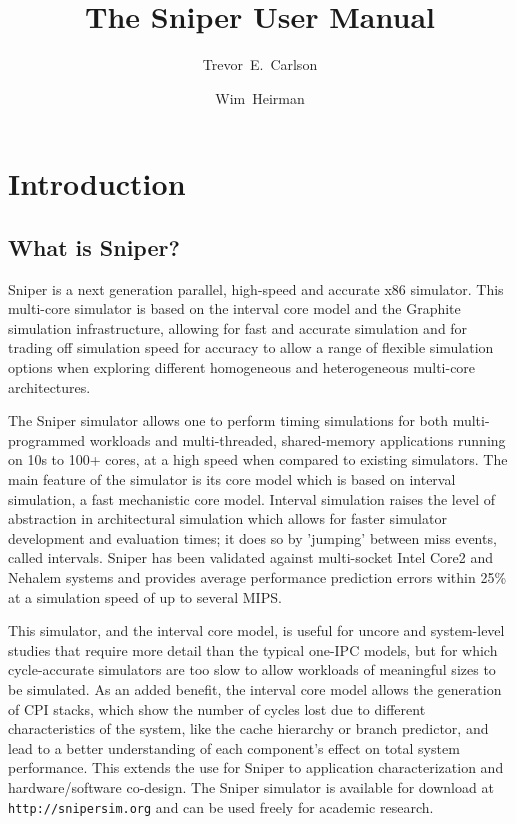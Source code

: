 \documentclass[a4paper,11pt,titlepage]{article}
\author{Trevor~E.~Carlson \and Wim~Heirman}
\title{The Sniper User Manual}
\begin{document}
\maketitle
\setcounter{tocdepth}{2}
\tableofcontents

\section{Introduction}

\subsection{What is Sniper?}

Sniper is a next generation parallel, high-speed and accurate x86 simulator.
This multi-core simulator is based on the interval core model and the
Graphite simulation infrastructure, allowing for fast and accurate simulation
and for trading off simulation speed for accuracy to allow a range of flexible
simulation options when exploring different homogeneous and heterogeneous multi-core architectures.

The Sniper simulator allows one to perform timing simulations for both multi-programmed workloads
and multi-threaded, shared-memory applications running on 10s to 100+ cores, at a high speed when compared
to existing simulators. The main feature of the simulator is its core model which
is based on interval simulation, a fast mechanistic core model. Interval simulation
raises the level of abstraction in architectural simulation which allows for
faster simulator development and evaluation times; it does so by 'jumping' between
miss events, called intervals.
Sniper has been validated against multi-socket Intel Core2 and Nehalem systems
and provides average performance prediction errors within 25\%
at a simulation speed of up to several MIPS.

This simulator, and the interval core model, is useful for uncore and system-level
studies that require more detail than the typical one-IPC models, but for which cycle-accurate
simulators are too slow to allow workloads of meaningful sizes to be simulated.
As an added benefit,
the interval core model allows the generation of CPI stacks, which show the number
of cycles lost due to different characteristics of the system, like the cache hierarchy
or branch predictor, and lead to a better understanding of each component's
effect on total system performance. This extends the use for Sniper
to application characterization and hardware/software co-design.
The Sniper simulator is available for download at \texttt{\footnotesize{http://snipersim.org}}
and can be used freely for academic research.
\end{document}
